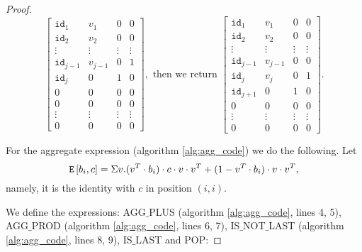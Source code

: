 \begin{proof}
    \[
    \begin{bmatrix}
        \texttt{id}_1 & v_1 & 0 & 0 \\
        \texttt{id}_2 & v_2 & 0 & 0 \\
        \vdots & \vdots & \vdots & \vdots \\
        \texttt{id}_{j-1} & v_{j-1} & 0 & 1 \\
        \texttt{id}_j & 0 & 1 & 0 \\
        0 & 0 & 0 & 0 \\
        0 & 0 & 0 & 0 \\
        \vdots & \vdots & \vdots & \vdots \\
        0 & 0 & 0 & 0
    \end{bmatrix}, \text{ then we return }
    \begin{bmatrix}
        \texttt{id}_1 & v_1 & 0 & 0 \\
        \texttt{id}_2 & v_2 & 0 & 0 \\
        \vdots & \vdots & \vdots & \vdots \\
        \texttt{id}_{j-1} & v_{j-1} & 0 & 0 \\
        \texttt{id}_j & v_j & 0 & 1 \\
        \texttt{id}_{j+1} & 0 & 1 & 0 \\
        0 & 0 & 0 & 0 \\
        \vdots & \vdots & \vdots & \vdots \\
        0 & 0 & 0 & 0
    \end{bmatrix}.
    \]


    For the aggregate expression (algorithm \ref{alg:agg_code}) we do the following. Let $$\texttt{E}\left[ b_i, c \right]=\Sigma v. (v^T\cdot b_i)\cdot c\cdot v\cdot v^T + (1-v^T\cdot b_i)\cdot v \cdot v^T,$$ namely, it is the identity with $c$ in position $(i,i)$.

    We define the expressions: AGG${\_}$PLUS (algorithm \ref{alg:agg_code}, lines 4, 5), AGG${\_}$PROD (algorithm \ref{alg:agg_code}, lines 6, 7),  IS${\_}$NOT${\_}$LAST (algorithm \ref{alg:agg_code}, lines 8, 9), IS${\_}$LAST and POP:


\end{proof}
